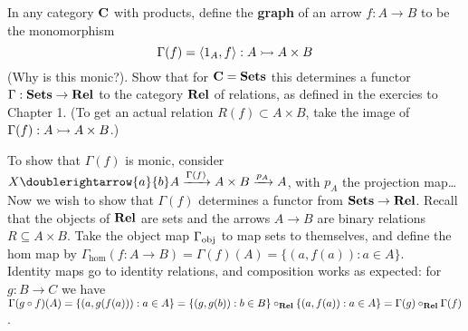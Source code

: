 \clearpage
\begin{BookProblem}{17}
  In any category \(\mathbf{{C}}\) with products, define the \textbf{graph} of an arrow
  \(f : A \to B\) to be the monomorphism
  \[\Gamma(f) = \langle 1_A, f\rangle : A \rightarrowtail A \times B\]
  (Why is this monic?). Show that for \(\mathbf{{C}} = \mathbf{{Sets}}\) this determines a functor
  \(\Gamma : \mathbf{{Sets}} \to \mathbf{{Rel}}\) to the category \(\mathbf{{Rel}}\) of relations, as defined
  in the exercies to Chapter 1. (To get an actual relation \(R(f) \subset A
  \times B\), take the image of \(\Gamma(f) : A \rightarrowtail A \times B\).)
  \begin{Solution}
    To show that \(\Gamma(f)\) is monic, consider \(X \doublerightarrow{a}{b} A
    \xto{\Gamma(f)} A \times B \xto{p_A} A\), with \(p_A\) the projection
    map\ldots\\

    Now we wish to show that \(\Gamma(f)\) determines a functor from \(\mathbf{{Sets}} \to
    \mathbf{{Rel}}\). Recall that the objects of \(\mathbf{{Rel}}\) are sets and the arrows \(A \to
    B\) are binary relations \(R \subseteq A \times B\). Take the object map
    \(\Gamma_{\text{obj}}\) to map sets to themselves, and define the hom map by
    \(\Gamma_{\hom} (f: A \to B) = \Gamma(f)(A) = \{(a, f(a)) : a \in A\}\).\\

    Identity maps go to identity relations, and composition works as expected:
    for \(g : B \to C\) we have \(\Gamma(g\circ f)(A) = \{(a, g(f(a))) : a \in
    A\} = \{(g, g(b)) : b \in B\} \circ_{\mathbf{{Rel}}} \{(a, f(a)) : a \in A\} = \Gamma(g)
    \circ_{\mathbf{{Rel}}} \Gamma(f)\).

  \end{Solution}
\end{BookProblem}

